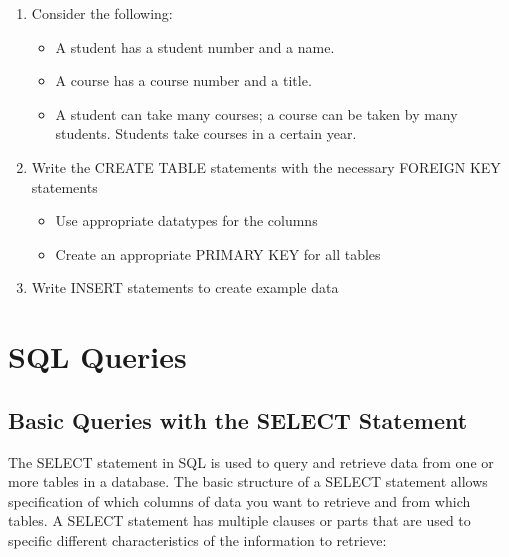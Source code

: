 \begin{exerciseboxpaper}
\begin{enumerate}
  \item Consider the following:
	\begin{itemize}
	  \item A student has a student number and a name. 
	  \item A course has a course number and a title. 
	  \item A student can take many courses; a course can be taken by many students. Students take courses in a certain year.
	\end{itemize}
  \item Write the CREATE TABLE statements with the necessary FOREIGN KEY statements
  \begin{itemize}
    \item Use appropriate datatypes for the columns
    \item Create an appropriate PRIMARY KEY for all tables
  \end{itemize}
  \item Write INSERT statements to create example data
\end{enumerate}
\end{exerciseboxpaper}

\section{SQL Queries}

\begin{advanced}
\subsection*{Basic Queries with the SELECT Statement}
\end{advanced}

The SELECT statement in SQL is used to query and retrieve data from one or more tables in a database. The basic structure of a SELECT statement allows specification of which columns of data you want to retrieve and from which tables. A SELECT statement has multiple clauses or parts that are used to specific different characteristics of the information to retrieve:

